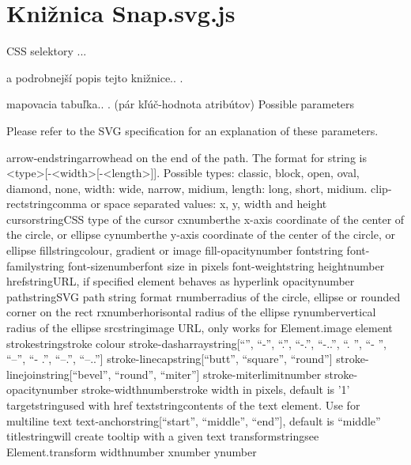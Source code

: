 \chapter{Knižnica Snap.svg.js}

CSS selektory ... 

a podrobnejší popis tejto knižnice.. .

mapovacia tabuľka.. . (pár kľúč-hodnota atribútov)
Possible parameters

Please refer to the SVG specification for an explanation of these parameters.

arrow-endstringarrowhead on the end of the path. The format for string is <type>[-<width>[-<length>]]. Possible types: classic, block, open, oval, diamond, none, width: wide, narrow, midium, length: long, short, midium.
clip-rectstringcomma or space separated values: x, y, width and height
cursorstringCSS type of the cursor
cxnumberthe x-axis coordinate of the center of the circle, or ellipse
cynumberthe y-axis coordinate of the center of the circle, or ellipse
fillstringcolour, gradient or image
fill-opacitynumber 
fontstring 
font-familystring 
font-sizenumberfont size in pixels
font-weightstring 
heightnumber 
hrefstringURL, if specified element behaves as hyperlink
opacitynumber 
pathstringSVG path string format
rnumberradius of the circle, ellipse or rounded corner on the rect
rxnumberhorisontal radius of the ellipse
rynumbervertical radius of the ellipse
srcstringimage URL, only works for Element.image element
strokestringstroke colour
stroke-dasharraystring[“”, “-”, “.”, “-.”, “-..”, “. ”, “- ”, “--”, “- .”, “--.”, “--..”]
stroke-linecapstring[“butt”, “square”, “round”]
stroke-linejoinstring[“bevel”, “round”, “miter”]
stroke-miterlimitnumber 
stroke-opacitynumber 
stroke-widthnumberstroke width in pixels, default is '1'
targetstringused with href
textstringcontents of the text element. Use \n for multiline text
text-anchorstring[“start”, “middle”, “end”], default is “middle”
titlestringwill create tooltip with a given text
transformstringsee Element.transform
widthnumber 
xnumber 
ynumber

